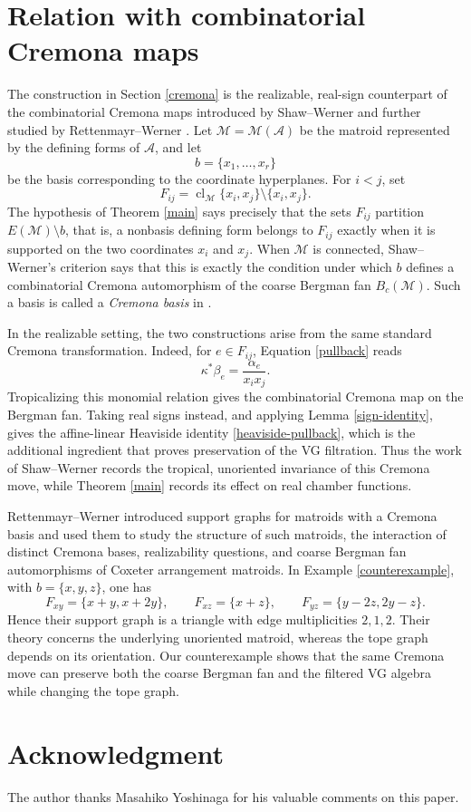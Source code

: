 \documentclass{amsart}
\numberwithin{equation}{section}
\theoremstyle{plain}
\theoremstyle{remark}
\theoremstyle{definition}
\numberwithin{equation}{section}
\newcommand{\A}{\mathcal{A}}
\newcommand{\M}{\mathcal{M}}
\begin{document}
\section{Relation with combinatorial Cremona maps}

The construction in Section \ref{cremona} is the realizable, real-sign counterpart of the combinatorial Cremona maps introduced by Shaw--Werner \cite{Shaw2023} and further studied by Rettenmayr--Werner \cite{Rettenmayr2025}.  Let $\M=\M(\A)$ be the matroid represented by the defining forms of $\A$, and let
\[
b=\{x_1,\ldots,x_r\}
\]
be the basis corresponding to the coordinate hyperplanes.  For $i<j$, set
\[
F_{ij}=\operatorname{cl}_\M\{x_i,x_j\}\setminus\{x_i,x_j\}.
\]
The hypothesis of Theorem \ref{main} says precisely that the sets $F_{ij}$ partition $E(\M)\setminus b$, that is, a nonbasis defining form belongs to $F_{ij}$ exactly when it is supported on the two coordinates $x_i$ and $x_j$.  When $\M$ is connected, Shaw--Werner's criterion \cite[Theorem~8.3]{Shaw2023} says that this is exactly the condition under which $b$ defines a combinatorial Cremona automorphism of the coarse Bergman fan $B_c(\M)$.  Such a basis is called a \emph{Cremona basis} in \cite{Rettenmayr2025}.

In the realizable setting, the two constructions arise from the same standard Cremona transformation.  Indeed, for $e\in F_{ij}$, Equation \eqref{pullback} reads
\[
\kappa^*\beta_e=\frac{\alpha_e}{x_ix_j}.
\]
Tropicalizing this monomial relation gives the combinatorial Cremona map on the Bergman fan.  Taking real signs instead, and applying Lemma \ref{sign-identity}, gives the affine-linear Heaviside identity \eqref{heaviside-pullback}, which is the additional ingredient that proves preservation of the VG filtration.  Thus the work of Shaw--Werner records the tropical, unoriented invariance of this Cremona move, while Theorem \ref{main} records its effect on real chamber functions.

Rettenmayr--Werner \cite{Rettenmayr2025} introduced support graphs for matroids with a Cremona basis and used them to study the structure of such matroids, the interaction of distinct Cremona bases, realizability questions, and coarse Bergman fan automorphisms of Coxeter arrangement matroids.  In Example \ref{counterexample}, with $b=\{x,y,z\}$, one has
\[
F_{xy}=\{x+y,x+2y\},\qquad
F_{xz}=\{x+z\},\qquad
F_{yz}=\{y-2z,2y-z\}.
\]
Hence their support graph is a triangle with edge multiplicities $2,1,2$.  Their theory concerns the underlying unoriented matroid, whereas the tope graph depends on its orientation.  Our counterexample shows that the same Cremona move can preserve both the coarse Bergman fan and the filtered VG algebra while changing the tope graph.



\section*{Acknowledgment}

The author thanks Masahiko Yoshinaga for his valuable comments on this paper.

\renewcommand\refname{References}


\end{document}
